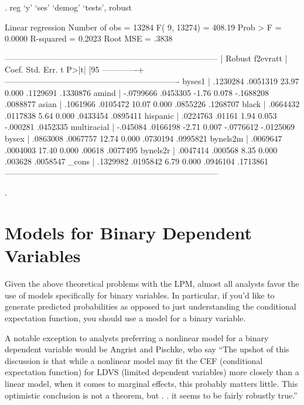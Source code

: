 \documentclass[12pt]{article}
\begin{document}
\begin{stlog}

. reg `y' `ses' `demog' `tests', robust

Linear regression                                      Number of obs =   13284
                                                       F(  9, 13274) =  408.19
                                                       Prob > F      =  0.0000
                                                       R-squared     =  0.2023
                                                       Root MSE      =   .3838

------------------------------------------------------------------------------
             |               Robust
    f2evratt |      Coef.   Std. Err.      t    P>|t|     [95%
-------------+----------------------------------------------------------------
      byses1 |   .1230284   .0051319    23.97   0.000     .1129691    .1330876
       amind |  -.0799666   .0453305    -1.76   0.078    -.1688208    .0088877
       asian |   .1061966   .0105472    10.07   0.000     .0855226    .1268707
       black |   .0664432   .0117838     5.64   0.000     .0433454    .0895411
    hispanic |   .0224763     .01161     1.94   0.053     -.000281    .0452335
 multiracial |   -.045084   .0166198    -2.71   0.007    -.0776612   -.0125069
       bysex |   .0863008   .0067757    12.74   0.000     .0730194    .0995821
    bynels2m |   .0069647   .0004003    17.40   0.000       .00618    .0077495
    bynels2r |   .0047414    .000568     8.35   0.000      .003628    .0058547
       _cons |   .1329982   .0195842     6.79   0.000     .0946104    .1713861
------------------------------------------------------------------------------

. 
\end{stlog}

\section{Models for Binary Dependent Variables}

Given the above theoretical problems with the LPM, almost all analysts
favor the use of models specifically for binary variables. In
particular, if you'd like to generate predicted probabilities as
opposed to just understanding the conditional expectation function,
you should use a model for a binary variable.

A notable exception to analysts preferring a nonlinear model for a
binary dependent variable would be Angrist and Pischke, who say ``The
upshot of this discussion is that while a nonlinear model may fit the
CEF (conditional expectation function) for LDVS (limited dependent
variables) more closely than a linear model, when it comes to marginal
effects, this probably matters little. This optimistic conclusion is
not a theorem, but . .  it seems to be fairly robustly true.''
\end{document}
